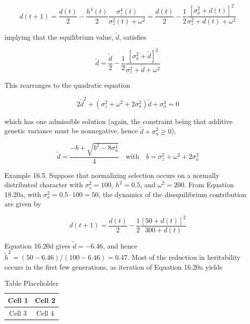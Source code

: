 \documentclass{article}
\begin{document}
\begin{equation}
d(t+1)=\frac{d(t)}{2}-\frac{h^{4}(t)}{2}\frac{\sigma_{z}^{4}(t)}{\sigma_{z}^{2}(t)+\omega^{2}}=\frac{d(t)}{2}-\frac{1}{2}\frac{[\sigma_{a}^{2}+d(t)]^{2}}{\sigma_{z}^{2}+d(t)+\omega^{2}}
\tag{16.20a}
\label{eq:16_20a}
\end{equation}

implying that the equilibrium value,  $ \tilde{d} $, satisfies

\begin{equation}
\widetilde{d}=\frac{\widetilde{d}}{2}-\frac{1}{2}\frac{[\sigma_{a}^{2}+\widetilde{d}]^{2}}{\sigma_{z}^{2}+\widetilde{d}+\omega^{2}}
\tag{16.20b}
\label{eq:16_20b}
\end{equation}

This rearranges to the quadratic equation

\begin{equation}
2\widetilde{d}^{2}+\left(\sigma_{z}^{2}+\omega^{2}+2\sigma_{a}^{2}\right)\widetilde{d}+\sigma_{a}^{4}=0
\tag{16.20c}
\label{eq:16_20c}
\end{equation}

which has one admissible solution (again, the constraint being that additive genetic variance must be nonnegative, hence  $ \widetilde{d} + \sigma_{a}^{2} \geq 0 $),

\begin{equation}
\widetilde{d}=\frac{-b+\sqrt{b^{2}-8\sigma_{a}^{4}}}{4}\quad\mathrm{w i t h}\quad b=\sigma_{z}^{2}+\omega^{2}+2\sigma_{a}^{2}
\tag{16.20d}
\label{eq:16_20d}
\end{equation}

Example 16.5. Suppose that normalizing selection occurs on a normally distributed character with  $ \sigma_z^2 = 100 $,  $ h^2 = 0.5 $, and  $ \omega^2 = 200 $. From Equation 18.20a, with  $ \sigma_a^2 = 0.5 \cdot 100 = 50 $, the dynamics of the disequilibrium contribution are given by

\begin{equation}
d(t+1)=\frac{d(t)}{2}-\frac{1}{2}\frac{[50+d(t)]^{2}}{300+d(t)}
\end{equation}

Equation 16.20d gives  $ \tilde{d} = -6.46 $, and hence  $ \tilde{h}^2 = (50 - 6.46)/(100 - 6.46) = 0.47 $. Most of the reduction in heritability occurs in the first few generations, as iteration of Equation 16.20a yields

\begin{table}[h]
\centering
\begin{tabular}{|c|c|}
\hline
Cell 1 & Cell 2 \\
\hline
Cell 3 & Cell 4 \\
\hline
\end{tabular}
\caption{Table Placeholder}
\end{table}
\end{document}
